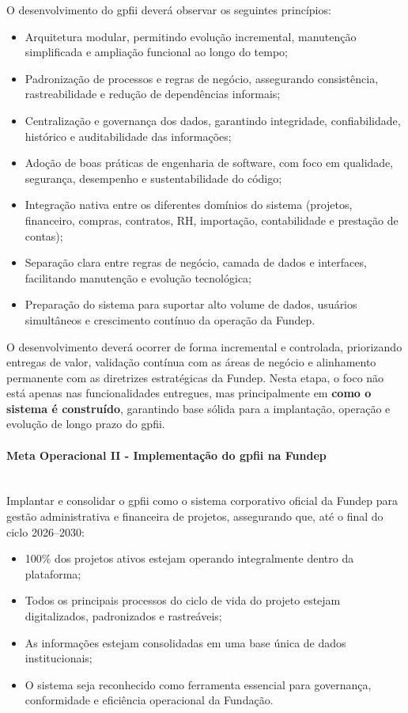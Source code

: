 \documentclass[12pt,a4paper]{article}
\begin{document}
O desenvolvimento do \gls{gpfii} deverá observar os seguintes princípios:
\begin{itemize}
  \item Arquitetura modular, permitindo evolução incremental, manutenção simplificada e ampliação funcional ao longo do tempo;
  \item Padronização de processos e regras de negócio, assegurando consistência, rastreabilidade e redução de dependências informais;
  \item Centralização e governança dos dados, garantindo integridade, confiabilidade, histórico e auditabilidade das informações;
  \item Adoção de boas práticas de engenharia de software, com foco em qualidade, segurança, desempenho e sustentabilidade do código;
  \item Integração nativa entre os diferentes domínios do sistema (projetos, financeiro, compras, contratos, RH, importação, contabilidade e prestação de contas);
  \item Separação clara entre regras de negócio, camada de dados e interfaces, facilitando manutenção e evolução tecnológica;
  \item Preparação do sistema para suportar alto volume de dados, usuários simultâneos e crescimento contínuo da operação da Fundep.
\end{itemize}

O desenvolvimento deverá ocorrer de forma incremental e controlada, priorizando entregas de valor, validação contínua com as áreas de negócio e alinhamento permanente com as diretrizes estratégicas da Fundep.  
Nesta etapa, o foco não está apenas nas funcionalidades entregues, mas principalmente em \textbf{como o sistema é construído}, garantindo base sólida para a implantação, operação e evolução de longo prazo do \gls{gpfii}.

\paragraph{Meta Operacional II - Implementação do \gls{gpfii} na Fundep}\mbox{}\\
Implantar e consolidar o \gls{gpfii} como o sistema corporativo oficial da Fundep para gestão administrativa e financeira de projetos, assegurando que, até o final do ciclo 2026–2030:
\begin{itemize}
  \item 100\% dos projetos ativos estejam operando integralmente dentro da plataforma;
  \item Todos os principais processos do ciclo de vida do projeto estejam digitalizados, padronizados e rastreáveis;
  \item As informações estejam consolidadas em uma base única de dados institucionais;
  \item O sistema seja reconhecido como ferramenta essencial para governança, conformidade e eficiência operacional da Fundação.
\end{itemize}
\end{document}
